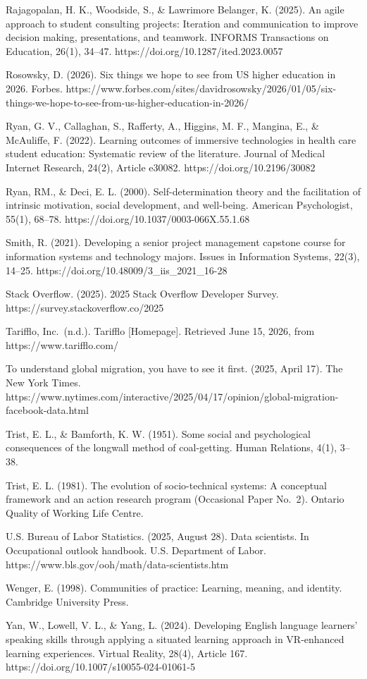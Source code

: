 \documentclass[
  12pt]{article}
\begin{document}
Rajagopalan, H. K., Woodside, S., \& Lawrimore Belanger, K. (2025). An
agile approach to student consulting projects: Iteration and
communication to improve decision making, presentations, and teamwork.
INFORMS Transactions on Education, 26(1), 34--47.
https://doi.org/10.1287/ited.2023.0057

Rosowsky, D. (2026). Six things we hope to see from US higher education
in 2026. Forbes.
https://www.forbes.com/sites/davidrosowsky/2026/01/05/six-things-we-hope-to-see-from-us-higher-education-in-2026/

Ryan, G. V., Callaghan, S., Rafferty, A., Higgins, M. F., Mangina, E.,
\& McAuliffe, F. (2022). Learning outcomes of immersive technologies in
health care student education: Systematic review of the literature.
Journal of Medical Internet Research, 24(2), Article e30082.
https://doi.org/10.2196/30082

Ryan, RM., \& Deci, E. L. (2000). Self-determination theory and the
facilitation of intrinsic motivation, social development, and
well-being. American Psychologist, 55(1), 68--78.
https://doi.org/10.1037/0003-066X.55.1.68

Smith, R. (2021). Developing a senior project management capstone course
for information systems and technology majors. Issues in Information
Systems, 22(3), 14--25. https://doi.org/10.48009/3\_iis\_2021\_16-28

Stack Overflow. (2025). 2025 Stack Overflow Developer Survey.
https://survey.stackoverflow.co/2025

Tarifflo, Inc.~(n.d.). Tarifflo {[}Homepage{]}. Retrieved June 15, 2026,
from https://www.tarifflo.com/

To understand global migration, you have to see it first. (2025, April
17). The New York Times.
https://www.nytimes.com/interactive/2025/04/17/opinion/global-migration-facebook-data.html

Trist, E. L., \& Bamforth, K. W. (1951). Some social and psychological
consequences of the longwall method of coal-getting. Human Relations,
4(1), 3--38.

Trist, E. L. (1981). The evolution of socio-technical systems: A
conceptual framework and an action research program (Occasional Paper
No.~2). Ontario Quality of Working Life Centre.

U.S. Bureau of Labor Statistics. (2025, August 28). Data scientists. In
Occupational outlook handbook. U.S. Department of Labor.
https://www.bls.gov/ooh/math/data-scientists.htm

Wenger, E. (1998). Communities of practice: Learning, meaning, and
identity. Cambridge University Press.

Yan, W., Lowell, V. L., \& Yang, L. (2024). Developing English language
learners' speaking skills through applying a situated learning approach
in VR-enhanced learning experiences. Virtual Reality, 28(4), Article
167. https://doi.org/10.1007/s10055-024-01061-5
\end{document}
